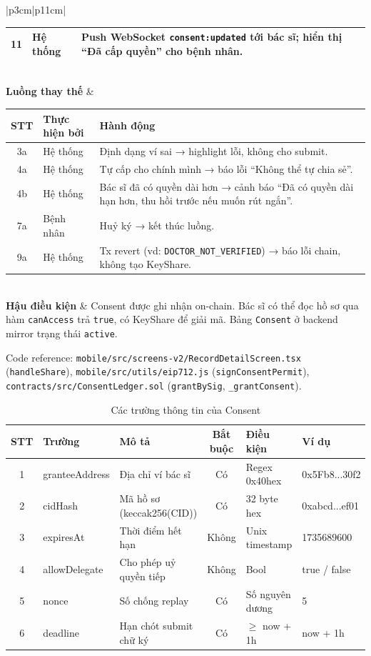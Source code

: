 \documentclass[../DoAn]{subfiles}
\begin{document}
\begin{table}[H]
\begin{tabular}{|p{3cm}|p{11cm}|}
\begin{tabular}{|c|p{2.3cm}|p{6cm}|}
11 & Hệ thống & Push WebSocket \texttt{consent:updated} tới bác sĩ; hiển thị ``Đã cấp quyền'' cho bệnh nhân. \\ \hline
\end{tabular} \\ \hline
\textbf{Luồng thay thế} &
\begin{tabular}{|c|p{2.3cm}|p{6cm}|}
\hline
\textbf{STT} & \textbf{Thực hiện bởi} & \textbf{Hành động} \\ \hline
3a & Hệ thống & Định dạng ví sai → highlight lỗi, không cho submit. \\ \hline
4a & Hệ thống & Tự cấp cho chính mình → báo lỗi ``Không thể tự chia sẻ''. \\ \hline
4b & Hệ thống & Bác sĩ đã có quyền dài hơn → cảnh báo ``Đã có quyền dài hạn hơn, thu hồi trước nếu muốn rút ngắn''. \\ \hline
7a & Bệnh nhân & Huỷ ký → kết thúc luồng. \\ \hline
9a & Hệ thống & Tx revert (vd: \texttt{DOCTOR\_NOT\_VERIFIED}) → báo lỗi chain, không tạo KeyShare. \\ \hline
\end{tabular} \\ \hline
\textbf{Hậu điều kiện} & Consent được ghi nhận on-chain. Bác sĩ có thể đọc hồ sơ qua hàm \texttt{canAccess} trả \texttt{true}, có KeyShare để giải mã. Bảng \texttt{Consent} ở backend mirror trạng thái \texttt{active}. \\ \hline
\end{tabular}
\end{table}

Code reference: \texttt{mobile/src/screens-v2/RecordDetailScreen.tsx} (\texttt{handleShare}), \texttt{mobile/src/utils/eip712.js} (\texttt{signConsentPermit}), \texttt{contracts/src/ConsentLedger.sol} (\texttt{grantBySig}, \texttt{\_grantConsent}).

\begin{table}[H]
\centering
\caption{Các trường thông tin của Consent}
\label{tab:uc002-fields}
\small
\renewcommand{\arraystretch}{1.2}
\begin{tabular}{|c|p{2.8cm}|p{4cm}|c|p{2.3cm}|p{2.2cm}|}
\hline
\textbf{STT} & \textbf{Trường} & \textbf{Mô tả} & \textbf{Bắt buộc} & \textbf{Điều kiện} & \textbf{Ví dụ} \\ \hline
1 & granteeAddress & Địa chỉ ví bác sĩ & Có & Regex 0x40hex & 0x5Fb8...30f2 \\ \hline
2 & cidHash & Mã hồ sơ (keccak256(CID)) & Có & 32 byte hex & 0xabcd...ef01 \\ \hline
3 & expiresAt & Thời điểm hết hạn & Không & Unix timestamp & 1735689600 \\ \hline
4 & allowDelegate & Cho phép uỷ quyền tiếp & Không & Bool & true / false \\ \hline
5 & nonce & Số chống replay & Có & Số nguyên dương & 5 \\ \hline
6 & deadline & Hạn chót submit chữ ký & Có & $\ge$ now + 1h & now + 1h \\ \hline
\end{tabular}
\end{table}
\end{document}
